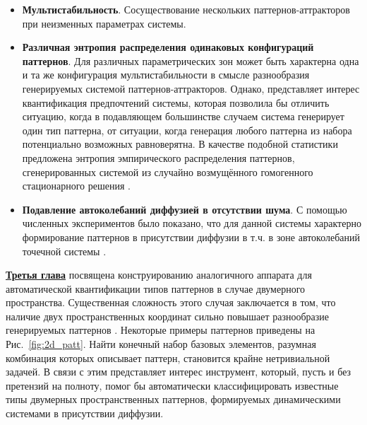 \begin{itemize}
    \item \textbf{Мультистабильность}. Сосуществование нескольких паттернов-аттракторов при неизменных параметрах системы.
    \item \textbf{Различная энтропия распределения одинаковых конфигураций паттернов}. Для различных параметрических зон может быть характерна одна и та же конфигурация мультистабильности в смысле разнообразия генерируемых системой паттернов-аттракторов. Однако, представляет интерес квантификация предпочтений системы, которая позволила бы отличить ситуацию, когда в подавляющем большинстве случаем система генерирует один тип паттерна, от ситуации, когда генерация любого паттерна из набора потенциально возможных равноверятна. В качестве подобной статистики предложена энтропия \cite{shannon1948mathematical} эмпирического распределения паттернов, сгенерированных системой из случайно возмущённого гомогенного стационарного решения \cite{bib5}.
    \item \textbf{Подавление автоколебаний диффузией в отсутствии шума}. С помощью численных экспериментов было показано, что для данной системы характерно формирование паттернов в присутствии диффузии в т.ч. в зоне автоколебаний точечной системы \cite{bib5}.
\end{itemize}

\underline{\textbf{Третья глава}} посвящена конструированию аналогичного аппарата для автоматической квантификации типов паттернов в случае двумерного пространства. Существенная сложность этого случая заключается в том, что наличие двух пространственных координат сильно повышает разнообразие генерируемых паттернов \cite{vanag2004waves}. Некоторые примеры паттернов приведены на Рис.~\ref{fig:2d_patt}. Найти конечный набор базовых элементов, разумная комбинация которых описывает паттерн, становится крайне нетривиальной задачей. В связи с этим представляет интерес инструмент, который, пусть и без претензий на полноту, помог бы автоматически классифицировать известные типы двумерных пространственных паттернов, формируемых динамическими системами в присутствии диффузии.

\begin{figure}[ht]   
\end{figure}

